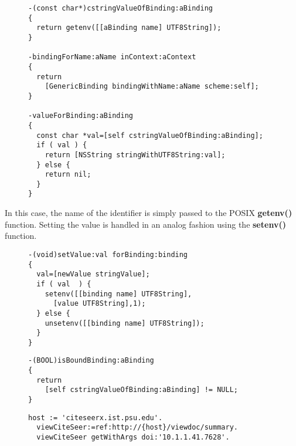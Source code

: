 \documentclass[preprint,authoryear]{acm_proc_article-sp}
\begin{document}
\begin{figure}[htbp]
\begin{lstlisting}[style=L,label=get-env,caption=Basic lookup in env: scheme.]
-(const char*)cstringValueOfBinding:aBinding
{
  return getenv([[aBinding name] UTF8String]);
}

-bindingForName:aName inContext:aContext
{
  return
    [GenericBinding bindingWithName:aName scheme:self];
}

-valueForBinding:aBinding
{
  const char *val=[self cstringValueOfBinding:aBinding];
  if ( val ) {
    return [NSString stringWithUTF8String:val];
  } else {
    return nil;
  }
}
\end{lstlisting}
\end{figure}

In this case, the name of the identifier is simply passed to the POSIX {\bf getenv()} function.
Setting the value is handled in an analog fashion using the {\bf setenv()} function.


\begin{figure}[htbp]
\begin{lstlisting}[style=L,label=setvalue-env,caption=Set value in env: scheme.]
-(void)setValue:val forBinding:binding
{
  val=[newValue stringValue];
  if ( val  ) {
    setenv([[binding name] UTF8String],
      [value UTF8String],1);
  } else {
    unsetenv([[binding name] UTF8String]);
  }
}
\end{lstlisting}
\end{figure}


\begin{figure}[htbp]
\begin{lstlisting}[style=L,label=hasValue-env,caption=Checking for presence of value in env: scheme.]
-(BOOL)isBoundBinding:aBinding
{
  return 
    [self cstringValueOfBinding:aBinding] != NULL;
}
\end{lstlisting}
\end{figure}


\begin{figure}[htbp]
\begin{lstlisting}[style=L,label=url-args,caption=URL arguments via reference and higher order message.]
  host := 'citeseerx.ist.psu.edu'.
  viewCiteSeer:=ref:http://{host}/viewdoc/summary.
  viewCiteSeer getWithArgs doi:'10.1.1.41.7628'.
\end{lstlisting}
\end{figure}

\end{document}
